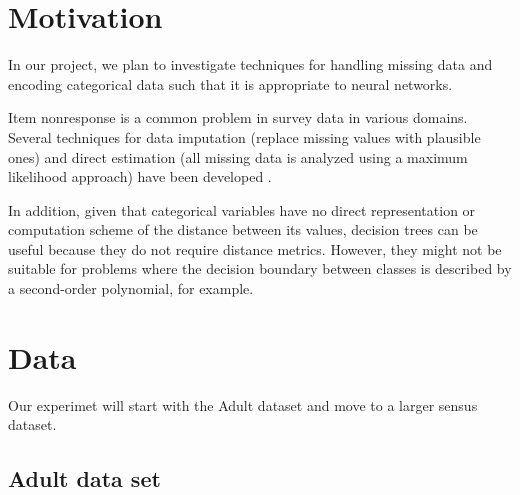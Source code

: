 \documentclass[12pt]{article}
\begin{document}
\maketitle

\section{Motivation}
In our project, we plan to investigate techniques for handling missing data and
encoding categorical data such that it is appropriate to neural networks.  



Item nonresponse is a common problem in survey data in various domains. Several
techniques for data imputation (replace missing values with plausible ones) and
direct estimation (all missing data is analyzed using a maximum likelihood
approach) have been developed \cite{de2003prevention}.


In addition, given that categorical variables have no direct representation or computation scheme of the distance between its values, decision trees can be useful because they do not require distance metrics. However, they might not be suitable for problems where the decision boundary between classes is described by a second-order polynomial, for example.\cite{fayyad1996data}

\section{Data}
Our experimet will start with the Adult dataset and move to a larger sensus dataset.
\subsection{Adult data set}
\end{document}
